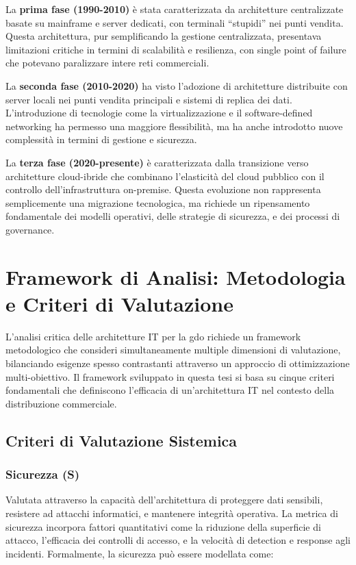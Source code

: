La \textbf{prima fase (1990-2010)} è stata caratterizzata da architetture centralizzate basate su mainframe e server dedicati, con terminali ``stupidi'' nei punti vendita. Questa architettura, pur semplificando la gestione centralizzata, presentava limitazioni critiche in termini di scalabilità e resilienza, con single point of failure che potevano paralizzare intere reti commerciali.

La \textbf{seconda fase (2010-2020)} ha visto l'adozione di architetture distribuite con server locali nei punti vendita principali e sistemi di replica dei dati. L'introduzione di tecnologie come la virtualizzazione e il software-defined networking ha permesso una maggiore flessibilità, ma ha anche introdotto nuove complessità in termini di gestione e sicurezza.

La \textbf{terza fase (2020-presente)} è caratterizzata dalla transizione verso architetture cloud-ibride che combinano l'elasticità del cloud pubblico con il controllo dell'infrastruttura on-premise. Questa evoluzione non rappresenta semplicemente una migrazione tecnologica, ma richiede un ripensamento fondamentale dei modelli operativi, delle strategie di sicurezza, e dei processi di governance.

\section{Framework di Analisi: Metodologia e Criteri di Valutazione}
\label{sec:framework-analisi}

L'analisi critica delle architetture IT per la \gls{gdo} richiede un framework metodologico che consideri simultaneamente multiple dimensioni di valutazione, bilanciando esigenze spesso contrastanti attraverso un approccio di ottimizzazione multi-obiettivo. Il framework sviluppato in questa tesi si basa su cinque criteri fondamentali che definiscono l'efficacia di un'architettura IT nel contesto della distribuzione commerciale.

\subsection{Criteri di Valutazione Sistemica}
\label{subsec:criteri-valutazione}

\subsubsection{Sicurezza (S)}

Valutata attraverso la capacità dell'architettura di proteggere dati sensibili, resistere ad attacchi informatici, e mantenere integrità operativa. La metrica di sicurezza incorpora fattori quantitativi come la riduzione della superficie di attacco, l'efficacia dei controlli di accesso, e la velocità di detection e response agli incidenti. Formalmente, la sicurezza può essere modellata come:

